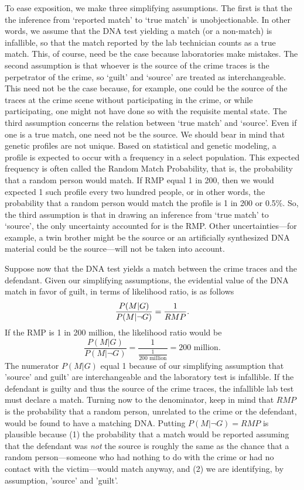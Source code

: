 \documentclass[10pt]{article}
\begin{document}
\noindent
To ease exposition, we make three simplifying 
assumptions. The first is that the the inference from `reported match' to `true match' is unobjectionable. In other words, we assume that 
the DNA test yielding a match (or a non-match) is infallible, so that the match reported by the lab technician counts as 
a true match. This, of course, need be the case because laboratories make mistakes. The second assumption is that whoever is the source of the crime traces is the perpetrator of the crime, so `guilt' and `source' are treated as interchangeable. This need not be the case because, for example, one could be the source of the traces at the crime scene without participating in the crime, or while participating, one might not have done so with the requisite mental state. 
The third assumption concerns the relation between `true match' and `source'.
Even if one is a true match, one need not be the source. We should bear in mind that genetic profiles 
are not unique. Based on statistical and genetic modeling, a profile is expected to occur with a frequency in a select population. This expected frequency is often called the Random Match Probability, that is, the probability that a random person would match.  If RMP equal 1 in 200, then we would expected 1 such profile every two hundred people, or in other words, the probability that a random person would match 
the profile is 1 in 200 or 0.5\%. So, the third assumption is that in drawing an inference from `true match' to `source', 
the only uncertainty accounted for is the RMP. Other uncertainties---for example, a twin brother might be the source or an artificially synthesized DNA material could be the source---will not be taken into account. 


Suppose now that the DNA test yields a match between the crime 
traces and the defendant.  Given our simplifying assumptions, 
the evidential value of the DNA match in favor of guilt, in terms of likelihood ratio, 
is as follows %
%
\[
{P(M | G) \over P(M | \neg G)} =   {1 \over RMP}.
\]
%
If the RMP is 1 in 200 million, the likelihood ratio would be
%
\[\frac{P(M |G)}{P( M | \neg G)}=\frac{1}{\frac{1}{\text{200 million}}}=\text{200 million}.\]
%
The numerator $P(M | G)$ equal 1 because of our simplifying assumption that 'source' and guilt' are interchangeable 
and the laboratory test is infallible. If the defendant is guilty and thus the source of the crime traces, the infallible 
lab test must declare a match. Turning now to the denominator, keep in mind that $RMP$ is the probability that a random person, 
unrelated to the crime or the defendant, would be found to have a matching DNA. 
Putting $P(M | \neg G)=RMP$ is plausible because (1) the probability that a match would be reported assuming that the defendant was \textit{not} the source is roughly the same as the chance that a random person---someone who had nothing to do with the crime or had no contact with the victim---would match anyway, and (2) we are identifying, by assumption,  'source' and 'guilt'. 
\end{document}

